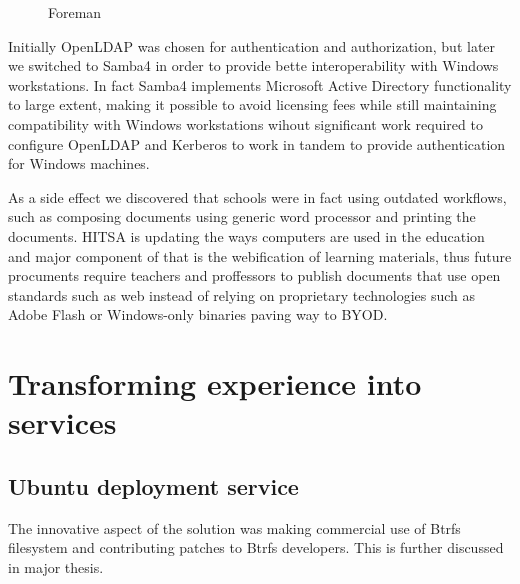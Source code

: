 \documentclass{article}
\begin{document}
\begin{figure}[!htb]
\centering
{}
\caption{Foreman}
\label{fig:digraph}
\end{figure}

Initially OpenLDAP was chosen for authentication and authorization,
but later we switched to Samba4 in order to provide bette
interoperability with Windows workstations.
In fact Samba4 implements Microsoft Active Directory functionality
to large extent,
making it possible to avoid licensing fees while still maintaining
compatibility with Windows workstations wihout
significant work required to configure OpenLDAP and Kerberos to
work in tandem to provide authentication for Windows machines.

As a side effect we discovered that schools were in fact
using outdated workflows, such as composing documents using
generic word processor and printing the documents.
HITSA is updating the ways computers are used in the education
and major component of that is the webification of 
learning materials, thus future procuments require
teachers and proffessors to publish documents that
use open standards such as web instead of relying on
proprietary technologies such as Adobe Flash or
Windows-only binaries paving way to BYOD.



\section{Transforming experience into services}

\subsection{Ubuntu deployment service}

The innovative aspect of the solution was making
commercial use of Btrfs filesystem and contributing patches
to Btrfs developers.
This is further discussed in major thesis.
\end{document}
